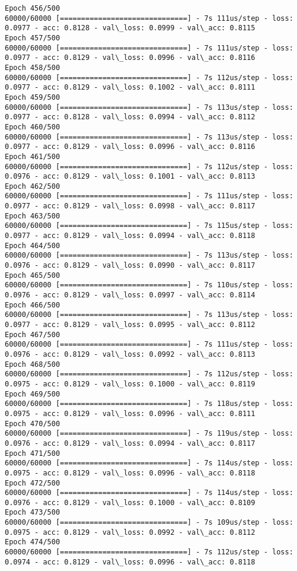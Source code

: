 \documentclass[11pt]{article}
\begin{document}
\begin{Verbatim}[commandchars=\\\{\}]
Epoch 456/500
60000/60000 [==============================] - 7s 111us/step - loss: 0.0977 - acc: 0.8128 - val\_loss: 0.0999 - val\_acc: 0.8115
Epoch 457/500
60000/60000 [==============================] - 7s 111us/step - loss: 0.0977 - acc: 0.8129 - val\_loss: 0.0996 - val\_acc: 0.8116
Epoch 458/500
60000/60000 [==============================] - 7s 112us/step - loss: 0.0977 - acc: 0.8129 - val\_loss: 0.1002 - val\_acc: 0.8111
Epoch 459/500
60000/60000 [==============================] - 7s 113us/step - loss: 0.0977 - acc: 0.8128 - val\_loss: 0.0994 - val\_acc: 0.8112
Epoch 460/500
60000/60000 [==============================] - 7s 113us/step - loss: 0.0977 - acc: 0.8129 - val\_loss: 0.0996 - val\_acc: 0.8116
Epoch 461/500
60000/60000 [==============================] - 7s 112us/step - loss: 0.0976 - acc: 0.8129 - val\_loss: 0.1001 - val\_acc: 0.8113
Epoch 462/500
60000/60000 [==============================] - 7s 111us/step - loss: 0.0977 - acc: 0.8129 - val\_loss: 0.0998 - val\_acc: 0.8117
Epoch 463/500
60000/60000 [==============================] - 7s 115us/step - loss: 0.0977 - acc: 0.8129 - val\_loss: 0.0994 - val\_acc: 0.8118
Epoch 464/500
60000/60000 [==============================] - 7s 113us/step - loss: 0.0976 - acc: 0.8129 - val\_loss: 0.0990 - val\_acc: 0.8117
Epoch 465/500
60000/60000 [==============================] - 7s 110us/step - loss: 0.0976 - acc: 0.8129 - val\_loss: 0.0997 - val\_acc: 0.8114
Epoch 466/500
60000/60000 [==============================] - 7s 113us/step - loss: 0.0977 - acc: 0.8129 - val\_loss: 0.0995 - val\_acc: 0.8112
Epoch 467/500
60000/60000 [==============================] - 7s 111us/step - loss: 0.0976 - acc: 0.8129 - val\_loss: 0.0992 - val\_acc: 0.8113
Epoch 468/500
60000/60000 [==============================] - 7s 112us/step - loss: 0.0975 - acc: 0.8129 - val\_loss: 0.1000 - val\_acc: 0.8119
Epoch 469/500
60000/60000 [==============================] - 7s 118us/step - loss: 0.0975 - acc: 0.8129 - val\_loss: 0.0996 - val\_acc: 0.8111
Epoch 470/500
60000/60000 [==============================] - 7s 119us/step - loss: 0.0976 - acc: 0.8129 - val\_loss: 0.0994 - val\_acc: 0.8117
Epoch 471/500
60000/60000 [==============================] - 7s 114us/step - loss: 0.0975 - acc: 0.8129 - val\_loss: 0.0996 - val\_acc: 0.8118
Epoch 472/500
60000/60000 [==============================] - 7s 114us/step - loss: 0.0976 - acc: 0.8129 - val\_loss: 0.1000 - val\_acc: 0.8109
Epoch 473/500
60000/60000 [==============================] - 7s 109us/step - loss: 0.0975 - acc: 0.8129 - val\_loss: 0.0992 - val\_acc: 0.8112
Epoch 474/500
60000/60000 [==============================] - 7s 112us/step - loss: 0.0974 - acc: 0.8129 - val\_loss: 0.0996 - val\_acc: 0.8118

\end{Verbatim}
\end{document}
